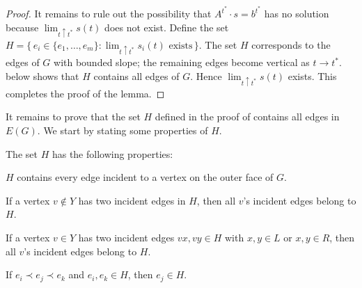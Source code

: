 \begin{proof}
	It remains to rule out the possibility that
	$A^{t^*}\cdot s=b^{t^*}$ has no solution because
	$\lim_{t\uparrow t^*} s(t)$ does not exist.  Define the set $H=\{\,e_i\in
	\{e_1,\ldots,e_m\}:\text{$\lim_{t\uparrow t^*} s_i(t)$ exists}\,\}$.
	The set $H$ corresponds to the edges of $G$
	with bounded slope; the remaining edges become vertical as $t\to t^*$.
	 below shows that $H$ contains all edges of $G$. Hence $\lim_{t\uparrow t^*} s(t)$ exists. This completes the proof of the lemma.
\end{proof}


It remains to prove that the set $H$ defined in the proof of  contains all edges in $E(G)$. We start by stating some properties of $H$.

	\begin{prop}
		The set   $H$ has the following properties: 
		\begin{compactenum}[(PR1)]
			\item $H$ contains every edge incident to a vertex on the outer face of $G$.
			\item \label{off-C}
			If a vertex $v\not\in Y$ has two incident edges in
			$H$,
			then all $v$'s incident edges belong to $H$.
			\item \label{on-C}
			If a vertex $v\in Y$ has two incident edges $vx,vy\in H$ with $x,y\in L$ or $x,y\in R$, then all $v$'s incident edges belong to $H$.
			\item If $e_i \prec e_j \prec e_k$ and $e_i,e_k\in H$, 
			then $e_j\in H$.
		\end{compactenum}
	\end{prop}
		
